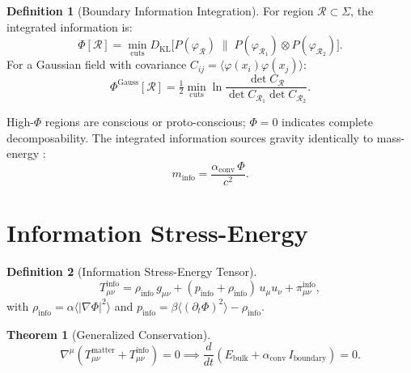 \documentclass[12pt,oneside]{book}
\theoremstyle{definition}
\newtheorem{definition}{Definition}[chapter]
\newtheorem{theorem}{Theorem}[chapter]
\newcommand{\Tinfo}{T^{\mathrm{info}}}
\newcommand{\Tmatter}{T^{\mathrm{matter}}}
\newcommand{\rhoinfo}{\rho_{\mathrm{info}}}
\newcommand{\pinfo}{p_{\mathrm{info}}}
\begin{document}
\begin{definition}[Boundary Information Integration]
  \label{def:phi}
  For region $\mathcal{R}\subset\Sigma$, the integrated information is:
  \begin{equation}
    \label{eq:phi}
    \Phi[\mathcal{R}]
    = \min_{\mathrm{cuts}} D_{\mathrm{KL}}\!\bigl[
        P(\varphi_\mathcal{R}) \;\big\|\;
        P(\varphi_{\mathcal{R}_1})\otimes P(\varphi_{\mathcal{R}_2})
      \bigr].
  \end{equation}
  For a Gaussian field with covariance $C_{ij} = \langle\varphi(x_i)\varphi(x_j)\rangle$:
  \begin{equation}
    \Phi^{\mathrm{Gauss}}[\mathcal{R}]
    = \tfrac{1}{2}\min_{\mathrm{cuts}}
      \ln\frac{\det C_\mathcal{R}}{\det C_{\mathcal{R}_1}\det C_{\mathcal{R}_2}}.
  \end{equation}
\end{definition}

High-$\Phi$ regions are conscious or proto-conscious; $\Phi = 0$ indicates complete
decomposability. The integrated information sources gravity identically to
mass-energy \citep{Tononi2008,Tononi2016}:
\begin{equation}
  m_{\mathrm{info}} = \frac{\alpha_{\mathrm{conv}}\,\Phi}{c^2}.
\end{equation}

\section{Information Stress-Energy}

\begin{definition}[Information Stress-Energy Tensor]
  \begin{equation}
    \Tinfo_{\mu\nu}
    = \rhoinfo\,g_{\mu\nu}
      + (\pinfo + \rhoinfo)\,u_\mu u_\nu
      + \pi^{\mathrm{info}}_{\mu\nu},
  \end{equation}
  with $\rhoinfo = \alpha\langle|\nabla\Phi|^2\rangle$ and
  $\pinfo = \beta\langle(\partial_t\Phi)^2\rangle - \rhoinfo$.
\end{definition}

\begin{theorem}[Generalized Conservation]
  \begin{equation}
    \nabla^\mu(\Tmatter_{\mu\nu} + \Tinfo_{\mu\nu}) = 0
    \implies
    \frac{d}{dt}(E_{\mathrm{bulk}} + \alpha_{\mathrm{conv}}\,I_{\mathrm{boundary}}) = 0.
  \end{equation}
\end{theorem}
\end{document}
